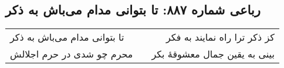 \begin{center}
\section*{رباعی شماره ۸۸۷: تا بتوانی مدام می‌باش به ذکر}
\label{sec:0887}
\begin{longtable}{l p{0.5cm} r}
تا بتوانی مدام می‌باش به ذکر
&&
کز ذکر ترا راه نمایند به فکر
\\
محرم چو شدی در حرم اجلالش
&&
بینی به یقین جمال معشوقهٔ بکر
\\
\end{longtable}
\end{center}

